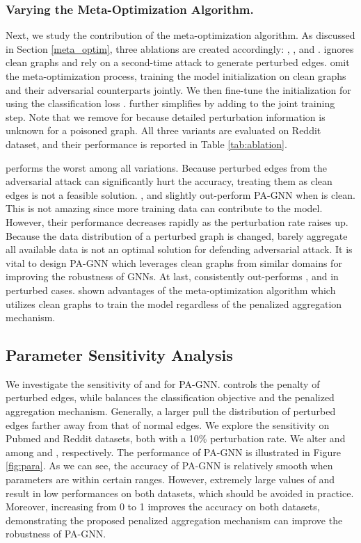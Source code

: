 \documentclass[sigconf]{acmart}
\newcommand{\ours}{{PA-GNN}\xspace}
\begin{document}
\subsubsection{Varying the Meta-Optimization Algorithm.}
\label{ablation:meta}
Next, we study the contribution of the meta-optimization algorithm. As discussed in Section \ref{meta_optim}, three ablations are created accordingly: , , and .
 ignores clean graphs and rely on a second-time attack to generate perturbed edges.
 omit the meta-optimization process, training the model initialization on clean graphs and their adversarial counterparts jointly. We then fine-tune the initialization for  using the classification loss .
 further simplifies  by adding  to the joint training step. Note that we remove  for  because detailed perturbation information is unknown for a poisoned graph.
All three variants are evaluated on Reddit dataset, and their performance is reported in Table \ref{tab:ablation}.

 performs the worst among all variations. Because perturbed edges from the adversarial attack can significantly hurt the accuracy, treating them as clean edges  is not a feasible solution.
, and  slightly out-perform \ours when  is clean. This is not amazing since more training data can contribute to the model. However, their performance decreases rapidly as the perturbation rate raises up. Because the data distribution of a perturbed graph is changed, barely aggregate all available data is not an optimal solution for defending adversarial attack. It is vital to design \ours which leverages clean graphs from similar domains for improving the robustness of GNNs.
At last,  consistently out-performs , and  in perturbed cases. shown advantages of the meta-optimization algorithm which utilizes clean graphs to train the model regardless of the penalized aggregation mechanism.


\subsection{Parameter Sensitivity Analysis} \label{sec:parameter_sensitivity}
We investigate the sensitivity of  and  for \ours.  controls the penalty of perturbed edges, while  balances the classification objective and the penalized aggregation mechanism.
Generally, a larger  pull the distribution of perturbed edges farther away from that of normal edges.
We explore the sensitivity on Pubmed and Reddit datasets, both with a 10\% perturbation rate. We alter  and  among  and , respectively. The performance of \ours is illustrated in Figure \ref{fig:para}. As we can see, the accuracy of \ours is relatively smooth when parameters are within certain ranges. However, extremely large values of  and  result in low performances on both datasets, which should be avoided in practice. Moreover, increasing  from 0 to 1 improves the accuracy on both datasets, demonstrating the proposed penalized aggregation mechanism can improve the robustness of \ours.
\end{document}
